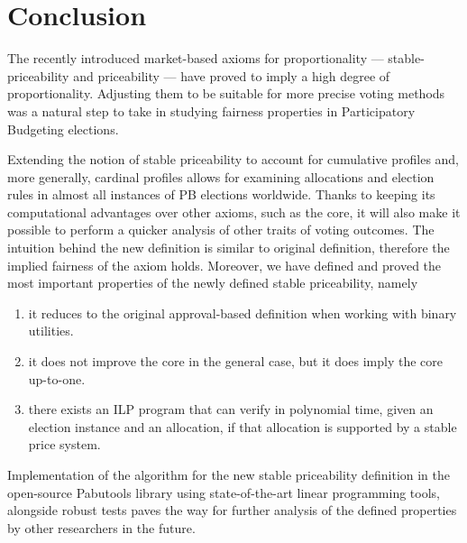 \chapter{Conclusion}\label{chap:5}
The recently introduced market-based axioms for proportionality --- stable-priceability and priceability --- have proved to imply a high degree of proportionality. Adjusting them to be suitable for more precise voting methods was a natural step to take in studying fairness properties in Participatory Budgeting elections.


Extending the notion of stable priceability to account for cumulative profiles and, more generally, cardinal profiles allows for examining allocations and election rules in almost all instances of PB elections worldwide. Thanks to keeping its computational advantages over other axioms, such as the core, it will also make it possible to perform a quicker analysis of other traits of voting outcomes. The intuition behind the new definition is similar to original definition, therefore the implied fairness of the axiom holds. Moreover, we have defined and proved the most important properties of the newly defined stable priceability, namely
\begin{enumerate}
    \item it reduces to the original approval-based definition when working with binary utilities.
    \item it does not improve the core in the general case, but it does imply the core up-to-one.
    \item there exists an ILP program that can verify in polynomial time, given an election instance and an allocation, if that allocation is supported by a stable price system.
\end{enumerate}

Implementation of the algorithm for the new stable priceability definition in the open-source Pabutools library using state-of-the-art linear programming tools, alongside robust tests paves the way for further analysis of the defined properties by other researchers in the future. 

